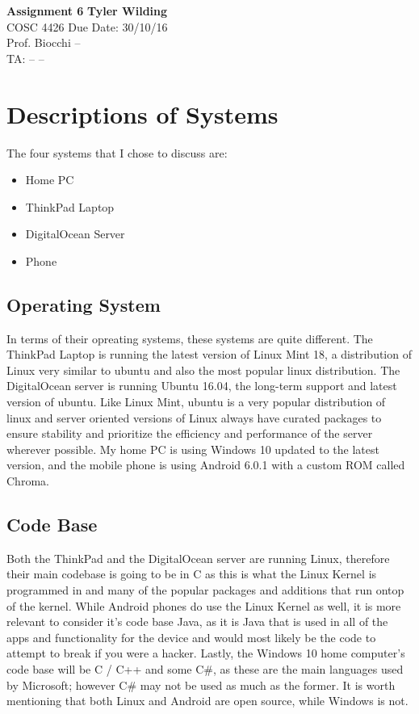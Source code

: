 \documentclass[a4paper, 11pt]{article}
\begin{document}
\noindent
\large\textbf{Assignment 6} \hfill \textbf{Tyler Wilding} \\
\normalsize COSC 4426 \hfill Due Date: 30/10/16 \\
Prof. Biocchi \hfill -- \\
TA: -- \hfill --

\section*{Descriptions of Systems}
The four systems that I chose to discuss are:
\begin{itemize}
\item Home PC
\item ThinkPad Laptop
\item DigitalOcean Server
\item Phone
\end{itemize}

\subsection*{Operating System}
In terms of their opreating systems, these systems are quite different.  The ThinkPad Laptop is running the latest version of Linux Mint 18, a distribution of Linux very similar to ubuntu and also the most popular linux distribution. The DigitalOcean server is running Ubuntu 16.04, the long-term support and latest version of ubuntu.  Like Linux Mint, ubuntu is a very popular distribution of linux and server oriented versions of Linux always have curated packages to ensure stability and prioritize the efficiency and performance of the server wherever possible.  My home PC is using Windows 10 updated to the latest version, and the mobile phone is using Android 6.0.1 with a custom ROM called Chroma.

\subsection*{Code Base}
Both the ThinkPad and the DigitalOcean server are running Linux, therefore their main codebase is going to be in C as this is what the Linux Kernel is programmed in and many of the popular packages and additions that run ontop of the kernel.  While Android phones do use the Linux Kernel as well, it is more relevant to consider it's code base Java, as it is Java that is used in all of the apps and functionality for the device and would most likely be the code to attempt to break if you were a hacker.  Lastly, the Windows 10 home computer's code base will be C / C++ and some C\#, as these are the main languages used by Microsoft; however C\# may not be used as much as the former.  It is worth mentioning that both Linux and Android are open source, while Windows is not.
\end{document}
